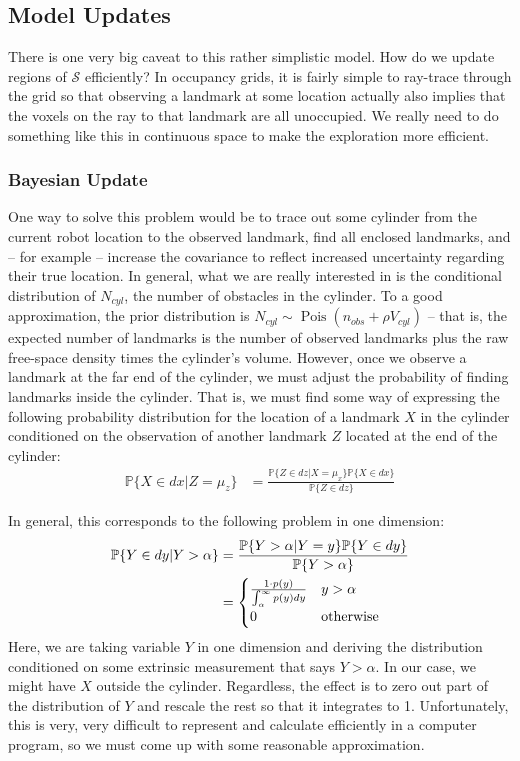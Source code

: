 \documentclass[12pt]{article}
\DeclareMathOperator{\Pois}{Pois}
\begin{document}
\subsection{Model Updates}

There is one very big caveat to this rather simplistic model. How do we update regions of $\mathcal{S}$ efficiently? In occupancy grids, it is fairly simple to ray-trace through the grid so that observing a landmark at some location actually also implies that the voxels on the ray to that landmark are all unoccupied. We really need to do something like this in continuous space to make the exploration more efficient.

\subsubsection{Bayesian Update}

One way to solve this problem would be to trace out some cylinder from the current robot location to the observed landmark, find all enclosed landmarks, and -- for example -- increase the covariance to reflect increased uncertainty regarding their true location. In general, what we are really interested in is the conditional distribution of $N_{cyl}$, the number of obstacles in the cylinder. To a good approximation, the prior distribution is $N_{cyl} \sim \Pois(n_{obs} + \rho V_{cyl})$ -- that is, the expected number of landmarks is the number of observed landmarks plus the raw free-space density times the cylinder's volume. However, once we observe a landmark at the far end of the cylinder, we must adjust the probability of finding landmarks inside the cylinder. That is, we must find some way of expressing the following probability distribution for the location of a landmark $X$ in the cylinder conditioned on the observation of another landmark $Z$ located at the end of the cylinder:
\begin{align}
  \mathbb{P}\{X \in dx | Z = \mu_z\} &=
  \frac{\mathbb{P}\{Z \in dz | X = \mu_x\} \mathbb{P}\{X \in dx\}}{\mathbb{P}\{Z \in dz\}}
\end{align}

In general, this corresponds to the following problem in one dimension:
\begin{align}
  \mathbb{P}\{Y \in dy | Y > \alpha\} &=
  \frac{\mathbb{P}\{Y > \alpha | Y = y\} \mathbb{P}\{Y \in dy\}}{\mathbb{P}\{Y > \alpha\}} \\
  &= \begin{cases}
    \frac{1 \cdot p(y)}{\int_{\alpha}^{\infty} p(y) dy} & y > \alpha \\
    0 & \textnormal{otherwise}
  \end{cases}
\end{align}
Here, we are taking variable $Y$ in one dimension and deriving the distribution conditioned on some extrinsic measurement that says $Y > \alpha$. In our case, we might have $X$ outside the cylinder. Regardless, the effect is to zero out part of the distribution of $Y$ and rescale the rest so that it integrates to 1. Unfortunately, this is very, very difficult to represent and calculate efficiently in a computer program, so we must come up with some reasonable approximation.
\end{document}
